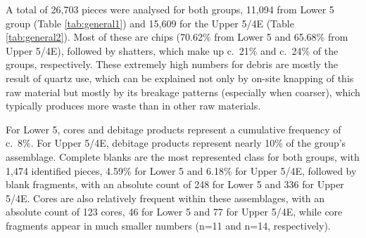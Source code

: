 \documentclass[12pt,twoside]{reedthesis}
\begin{document}
A total of 26,703 pieces were analysed for both groups, 11,094 from Lower 5 group (Table \ref{tab:general1}) and 15,609 for the Upper 5/4E (Table \ref{tab:general2}). Most of these are chips (70.62\% from Lower 5 and 65.68\% from Upper 5/4E), followed by shatters, which make up c.~21\% and c.~24\% of the groups, respectively. These extremely high numbers for debris are mostly the result of quartz use, which can be explained not only by on-site knapping of this raw material but mostly by its breakage patterns (especially when coarser), which typically produces more waste than in other raw materials.

For Lower 5, cores and debitage products represent a cumulative frequency of c.~8\%. For Upper 5/4E, debitage products represent nearly 10\% of the group's assemblage. Complete blanks are the most represented class for both groups, with 1,474 identified pieces, 4.59\% for Lower 5 and 6.18\% for Upper 5/4E, followed by blank fragments, with an absolute count of 248 for Lower 5 and 336 for Upper 5/4E. Cores are also relatively frequent within these assemblages, with an absolute count of 123 cores, 46 for Lower 5 and 77 for Upper 5/4E, while core fragments appear in much smaller numbers (n=11 and n=14, respectively).
\end{document}

